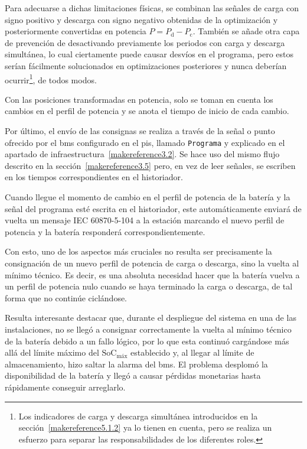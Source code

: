 Para adecuarse a dichas limitaciones físicas, se combinan las señales de carga con signo positivo y descarga con signo negativo obtenidas de la optimización y posteriormente convertidas en potencia \( P = P_{\text{d}} - P_{\mathrm{c}} \). También se añade otra capa de prevención de desactivando previamente los periodos con carga y descarga simultánea, lo cual ciertamente puede causar desvíos en el programa, pero estos serían fácilmente solucionados en optimizaciones posteriores y nunca deberían ocurrir\footnote{Los indicadores de carga y descarga simultánea introducidos en la sección~\ref{makereference5.1.2} ya lo tienen en cuenta, pero se realiza un esfuerzo para separar las responsabilidades de los diferentes roles.}, de todos modos.

Con las posiciones transformadas en potencia, solo se toman en cuenta los cambios en el perfil de potencia y se anota el tiempo de inicio de cada cambio.

Por último, el envío de las consignas se realiza a través de la señal o punto ofrecido por el \gls{bms} configurado en el \gls{pis}, llamado \texttt{Programa} y explicado en el apartado de infraestructura~\ref{makereference3.2}. Se hace uso del mismo flujo descrito en la sección~\ref{makereference3.5} pero, en vez de leer señales, se escriben en los tiempos correspondientes en el historiador.

Cuando llegue el momento de cambio en el perfil de potencia de la batería y la señal del programa esté escrita en el historiador, este automáticamente enviará de vuelta un mensaje IEC 60870{-}5{-}104 a la estación marcando el nuevo perfil de potencia y la batería responderá correspondientemente.

Con esto, uno de los aspectos más cruciales no resulta ser precisamente la consignación de un nuevo perfil de potencia de carga o descarga, sino la vuelta al mínimo técnico. Es decir, es una absoluta necesidad hacer que la batería vuelva a un perfil de potencia nulo cuando se haya terminado la carga o descarga, de tal forma que no continúe ciclándose.

Resulta interesante destacar que, durante el despliegue del sistema en una de las instalaciones, no se llegó a consignar correctamente la vuelta al mínimo técnico de la batería debido a un fallo lógico, por lo que esta continuó cargándose más allá del límite máximo del \( \mathrm{SoC}_{\text{máx}} \) establecido y, al llegar al límite de almacenamiento, hizo saltar la alarma del \gls{bms}. El problema desplomó la disponibilidad de la batería y llegó a causar pérdidas monetarias hasta rápidamente conseguir arreglarlo.

